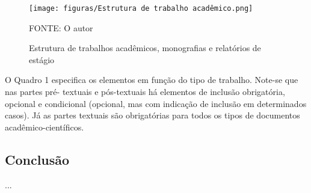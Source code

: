 \documentclass[a4paper,12pt]{article}  %
\begin{document}
\begin{ElementosTextuais}
\begin{Desenvolvimento}
\begin{figure}[h!]
  \centering
  \texttt{[image: figuras/Estrutura de trabalho acadêmico.png]}
  \caption{Estrutura de trabalhos acadêmicos, monografias e relatórios de estágio}
  \vspace{0em}
  \begin{minipage}{\textwidth}
    FONTE: O autor
  \end{minipage}
  \label{fig:EstruturaTrabalhoAcademico}
\end{figure}


O Quadro 1 especifica os elementos em função do tipo de trabalho. Note-se que nas partes pré- textuais e pós-textuais há elementos de inclusão obrigatória, opcional e condicional (opcional, mas com indicação de inclusão em determinados casos). Já as partes textuais são obrigatórias para todos os tipos de documentos acadêmico-científicos.




\end{Desenvolvimento}

\begin{Conclusao} %

\section{Conclusão}
...

\end{Conclusao}

\end{ElementosTextuais}

\begin{ElementosPosTextuais}
\begin{Referencias} %
\end{Referencias}

\begin{Glossario} %
\end{Glossario}

\begin{Apendice} %
\end{Apendice}

\begin{Anexo} %
\end{Anexo}

\begin{Indice} %
\end{Indice}

\end{ElementosPosTextuais}
\end{document}
